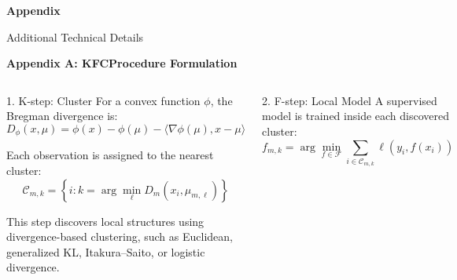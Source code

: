 \begin{frame}

    \centering
    \vspace{2.2cm}
    \Huge\color{mainblue}\textbf{Appendix}

    \vspace{0.35cm}

    {\large Additional Technical Details}

\end{frame}

\begin{frame}
    \scriptsize

    \vspace{-0.35cm}

    {\Large\color{mainblue}\textbf{Appendix A: KFCProcedure Formulation}}

    \vspace{0.25cm}

    \begin{columns}[T,onlytextwidth]


        \begin{block}{1. K-step: Cluster}
            For a convex function \(\phi\), the Bregman divergence is:
            \[
                D_{\phi}(x,\mu)
                =
                \phi(x)-\phi(\mu)
                -
                \langle \nabla \phi(\mu), x-\mu \rangle
            \]

            Each observation is assigned to the nearest cluster:
            \[
                \mathcal{C}_{m,k}
                =
                \left\{
                i :
                k =
                \arg\min_{\ell}
                D_m(x_i,\mu_{m,\ell})
                \right\}
            \]

            {\tiny
                This step discovers local structures using divergence-based clustering, such as Euclidean, generalized KL, Itakura--Saito, or logistic divergence.
            }
        \end{block}


        \begin{block}{2. F-step: Local Model}
            A supervised model is trained inside each discovered cluster:
            \[
                f_{m,k}
                =
                \arg\min_{f \in \mathcal{F}}
                \sum_{i \in \mathcal{C}_{m,k}}
                \ell(y_i,f(x_i))
            \]


\end{block}
\end{columns}
\end{frame}
